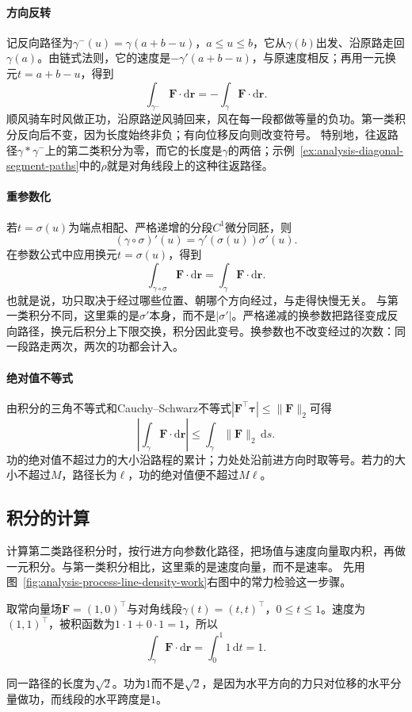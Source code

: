 \paragraph{方向反转}

记反向路径为$\gamma^{-}(u)=\gamma(a+b-u)$，$a\leq u\leq b$，它从$\gamma(b)$出发、沿原路走回$\gamma(a)$。由链式法则，它的速度是$-\gamma'(a+b-u)$，与原速度相反；再用一元换元$t=a+b-u$，得到
\[
 \int_{\gamma^{-}}\bm F\cdot\mathrm d\bm r
 =-\int_\gamma\bm F\cdot\mathrm d\bm r.
\]
顺风骑车时风做正功，沿原路逆风骑回来，风在每一段都做等量的负功。第一类积分反向后不变，因为长度始终非负；有向位移反向则改变符号。
特别地，往返路径$\gamma*\gamma^{-}$上的第二类积分为零，而它的长度是$\gamma$的两倍；示例~\ref{ex:analysis-diagonal-segment-paths}中的$\rho$就是对角线段上的这种往返路径。

\paragraph{重参数化}

若$t=\sigma(u)$为端点相配、严格递增的分段$C^1$微分同胚，则
\[
 (\gamma\circ\sigma)'(u)=\gamma'(\sigma(u))\sigma'(u).
\]
在参数公式中应用换元$t=\sigma(u)$，得到
\[
 \int_{\gamma\circ\sigma}\bm F\cdot\mathrm d\bm r
 =\int_\gamma\bm F\cdot\mathrm d\bm r.
\]
也就是说，功只取决于经过哪些位置、朝哪个方向经过，与走得快慢无关。
与第一类积分不同，这里乘的是$\sigma'$本身，而不是$|\sigma'|$。严格递减的换参数把路径变成反向路径，换元后积分上下限交换，积分因此变号。换参数也不改变经过的次数：同一段路走两次，两次的功都会计入。

\paragraph{绝对值不等式}

由积分的三角不等式和Cauchy--Schwarz不等式$|\bm F^\top\bm\tau|\leq\lVert\bm F\rVert_2$可得
\[
 \left|\int_\gamma\bm F\cdot\mathrm d\bm r\right|
 \leq\int_\gamma\lVert\bm F\rVert_2\,\mathrm ds.
\]
功的绝对值不超过力的大小沿路程的累计；力处处沿前进方向时取等号。若力的大小不超过$M$，路径长为$\ell$，功的绝对值便不超过$M\ell$。

\subsection{积分的计算}

计算第二类路径积分时，按行进方向参数化路径，把场值与速度向量取内积，再做一元积分。与第一类积分相比，这里乘的是速度向量，而不是速率。
先用图~\ref{fig:analysis-process-line-density-work}右图中的常力检验这一步骤。
\begin{example}[常力沿对角线段做功]
取常向量场$\bm F=(1,0)^\top$与对角线段$\gamma(t)=(t,t)^\top$，$0\leq t\leq1$。速度为$(1,1)^\top$，被积函数为$1\cdot1+0\cdot1=1$，所以
\[
 \int_\gamma\bm F\cdot\mathrm d\bm r=\int_0^1 1\,\mathrm dt=1.
\]
\end{example}
同一路径的长度为$\sqrt2$。功为$1$而不是$\sqrt2$，是因为水平方向的力只对位移的水平分量做功，而线段的水平跨度是$1$。

